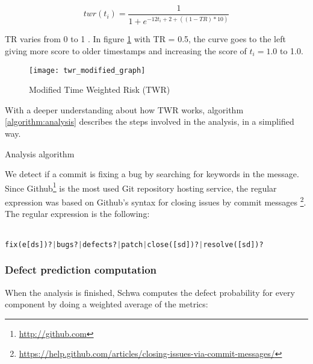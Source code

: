 \begin{equation}
twr(t_i) = \frac{1}{1 + e^{-12t_i + 2 + ( (1 - TR)* 10) }}
\end{equation}

TR varies from 0 to 1 . In figure \ref{figure:twr_modified_graph} with TR = 0.5,
the curve goes to the left giving more score to older timestamps and increasing
the score of $t_i = 1.0$ to 1.0.

\begin{figure}[!ht]
    \begin{center}
        \texttt{[image: twr\_modified\_graph]}
        \caption{Modified Time Weighted Risk (TWR)}
        \label{figure:twr_modified_graph}
    \end{center}
\end{figure}

With a deeper understanding about how TWR works, algorithm
\ref{algorithm:analysis} describes the steps involved in the analysis, in a
simplified way.\*

\begin{algorithm}[H]
\caption{Analysis algorithm}
\label{algorithm:analysis}
\end{algorithm}

We detect if a commit is fixing a bug by searching for keywords in the message.
Since Github\footnote{\url{http://github.com}} is the most used Git repository
hosting service, the regular expression was based on Github's syntax for
closing issues by commit messages
\footnote{\url{https://help.github.com/articles/closing-issues-via-commit-messages/}}.
The regular expression is the following:
\\
\\
\begin{lstlisting}[language=python, caption=Bug-fixing message regular expression]
fix(e[ds])?|bugs?|defects?|patch|close([sd])?|resolve([sd])?
\end{lstlisting}

\subsubsection{Defect prediction computation}
When the analysis is finished, Schwa computes the defect probability for every
component by doing a weighted average of the metrics:

